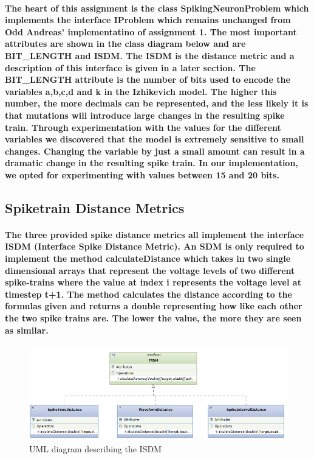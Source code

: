 \documentclass[titlepage,norsk]{article}
\begin{document}
\paragraph{
The heart of this assignment is the class SpikingNeuronProblem which implements the interface IProblem which remains unchanged from Odd Andreas' implementatino of assignment 1. The most important attributes are shown in the class diagram below and are BIT\_LENGTH and ISDM. The ISDM is the distance metric and a description of this interface is given in a later section. The BIT\_LENGTH attribute is the number of bits used to encode the variables a,b,c,d and k in the Izhikevich model. The higher this number, the more decimals can be represented, and the less likely it is that mutations will introduce large changes in the resulting spike train. Through experimentation with the values for the different variables we discovered that the model is extremely sensitive to small changes. Changing the variable by just a small amount can result in a dramatic change in the resulting spike train. In our implementation, we opted for experimenting with values between 15 and 20 bits.
}



\subsection{Spiketrain Distance Metrics}

\paragraph{
The three provided spike distance metrics all implement the interface ISDM (Interface Spike Distance Metric). An SDM is only required to implement the method calculateDistance which takes in two single dimensional arrays that represent the voltage levels of  two different spike-trains where the value at index i represents the voltage level at timestep t+1. The method calculates the distance according to the formulas given and returns a double representing how like each other the two spike trains are. The lower the value, the more they are seen as similar. 
}

\begin{figure}
\centering
\includegraphics[scale=0.75]{ISDM.png}
\caption{UML diagram describing the ISDM}
\label{fig:awesome_image}
\end{figure}
\end{document}
